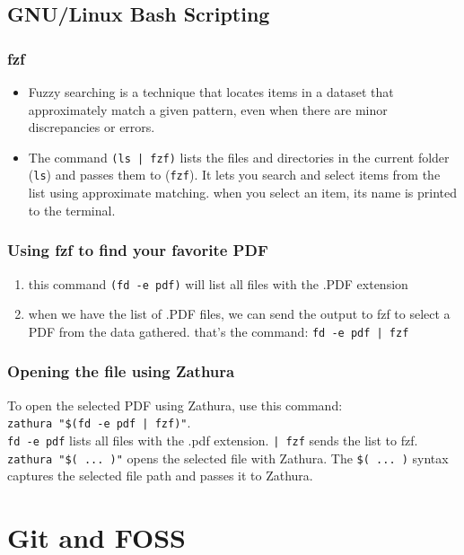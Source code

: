 \documentclass{article}
\begin{document}
    \subsection{GNU/Linux Bash Scripting}
        \subsubsection{fzf}
        \begin{itemize}
            \item Fuzzy searching is a technique that locates items in a dataset that approximately match a given pattern, even when there are minor discrepancies or errors.
            \item The command \texttt{(ls | fzf)} lists the files and directories in the current folder (\texttt{ls}) and passes them to (\texttt{fzf}). It lets you search and select items from the list using approximate matching. when you select an item, its name is printed to the terminal.
        \end{itemize}
        \subsubsection{Using fzf to find your favorite PDF}
        \begin{enumerate}
            \item this command \texttt{(fd -e pdf)} will list all files with the .PDF extension
            \item when we have the list of .PDF files, we can send the output to fzf to select a PDF from the data gathered. that’s the command: \texttt{fd -e pdf | fzf}
        \end{enumerate}
        \subsubsection{Opening the file using Zathura}
        To open the selected PDF using Zathura, use this command:\\ 
        \texttt{zathura "\$(fd -e pdf | fzf)"}.
        \\\texttt{fd -e pdf} lists all files with the .pdf extension. \texttt{| fzf} sends the list to fzf. \texttt{zathura "\$( ... )"} 
         opens the selected file with Zathura. The \texttt{\$( ... )} syntax captures the selected file path and passes it to Zathura.

\section{Git and FOSS}
\end{document}
